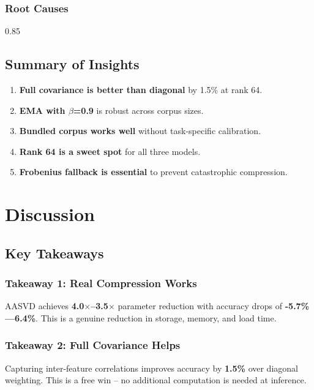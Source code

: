 \subsubsection{Root Causes}

0.85

\subsection{Summary of Insights}

\begin{enumerate}
\item \textbf{Full covariance is better than diagonal} by 1.5\% at rank 64.
\item \textbf{EMA with $\beta$=0.9} is robust across corpus sizes.
\item \textbf{Bundled corpus works well} without task-specific calibration.
\item \textbf{Rank 64 is a sweet spot} for all three models.
\item \textbf{Frobenius fallback is essential} to prevent catastrophic compression.
\end{enumerate}


\section{Discussion}

\subsection{Key Takeaways}

\subsubsection{Takeaway 1: Real Compression Works}

AASVD achieves \textbf{4.0$\times$--3.5$\times$} parameter reduction with 
accuracy drops of \textbf{-5.7\%---6.4\%}. This is a genuine reduction 
in storage, memory, and load time.

\subsubsection{Takeaway 2: Full Covariance Helps}

Capturing inter-feature correlations improves accuracy by 
\textbf{1.5\%} over diagonal weighting. This is a free win -- no additional 
computation is needed at inference.

